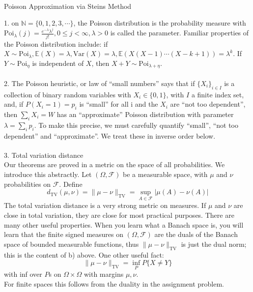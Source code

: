 \documentclass[12pt]{article}
\begin{document}
\begin{center}
	Poisson Approximation via Steins Method
\end{center}
1. on $\mathbb{N} = \{0, 1, 2, 3, \cdots\}$, the Poisson distribution is the probability measure with $\text{Poi}_{\lambda}(j) = \frac{e^{-\lambda}\lambda^j}{j!}, 0 \leqslant j < \infty, \lambda > 0$ is called the parameter. Familiar properties of the Poisson distribution include: if $X \sim \text{Poi}_{\lambda}, \mathbb{E}(X) = \lambda, \textrm{Var}(X) = \lambda, \mathbb{E}\left(X(X - 1)\cdots(X - k + 1)\right) = \lambda^k$. If $Y \sim \text{Poi}_{\eta}$ is independent of $X$, then $X + Y \sim \text{Poi}_{\lambda+\eta}$.\\
\\
2. The Poisson heuristic, or law of ``small numbers'' says that if $\{X_i\}_{i \in I}$ is a collection of binary random variables with $X_i \in \{0, 1\}$, with $I$ a finite index set, and, if $P(X_i = 1) = p_i$ is ``small'' for all i and the $X_i$ are ``not too dependent'', then $\sum_{i}X_i = W$ has an ``approximate'' Poisson distribution with parameter $\lambda = \sum_i p_i$. To make this precise, we must carefully quantify ``small'', ``not too dependent'' and ``approximate''. We treat these in inverse order below.\\
\\
3. Total variation distance\\
Our theorems are proved in a metric on the space of all probabilities. We introduce this abstractly. Let $(\Omega, \mathcal{F})$ be a measurable space, with $\mu$ and $\nu$ probabilities on $\mathcal{F}$. Define
$$d_{\text{TV}}(\mu, \nu) = \|\mu - \nu\|_{\text{TV}} = \sup_{A \in \mathcal{F}}|\mu(A) - \nu(A)|$$
The total variation distance is a very strong metric on measures. If $\mu$ and $\nu$ are close in total variation, they are close for most practical purposes. There are many other useful properties. When you learn what a Banach space is, you will learn that the finite signed measures on $(\Omega, \mathcal{F})$ are the duals of the Banach space of bounded measurable functions, thus $\|\mu - \nu\|_{\text{TV}}$ is just the dual norm; this is the content of b) above. One other useful fact:\\
$$\|\mu - \nu\|_{\text{TV}} = \inf_P P\{X \neq Y\}$$
with inf over $P$s on $\Omega \times \Omega$ with margins $\mu, \nu$.\\
For finite spaces this follows from the duality in the assignment problem.\\
\\
\end{document}
